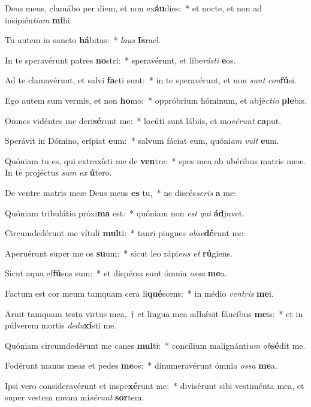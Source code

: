 \item Deus meus, clamábo per diem, et non ex\textbf{áu}dies:~* et nocte, et non ad insipién\textit{tiam} \textbf{mi}hi.
\item Tu autem in sancto \textbf{há}bitas:~* \textit{laus} \textbf{Is}rael.
\item In te speravérunt patres \textbf{no}stri:~* speravérunt, et libe\textit{rásti} \textbf{e}os.
\item Ad te clamavérunt, et salvi \textbf{fa}cti sunt:~* in te speravérunt, et non \textit{sunt} \textit{con}\textbf{fú}si.
\item Ego autem sum vermis, et non \textbf{ho}mo:~* oppróbrium hóminum, et abjé\tinyhspace\textit{ctio} \textbf{ple}bis.
\item Omnes vidéntes me deri\textbf{sé}runt me:~* locúti sunt lábiis, et mo\textit{vérunt} \textbf{ca}put.
\item Sperávit in Dómino, erípiat \textbf{e}um:~* salvum fáciat eum, quóni\tinyhspace\textit{am} \textit{vult} \textbf{e}um.
\item Quóniam tu es, qui extraxísti me de \textbf{ven}tre:~* spes mea ab ubéribus matris meæ. In te projéctus \textit{sum} \textit{ex} \textbf{ú}tero.
\item De ventre matris meæ Deus meus \textbf{es} tu,~* ne discés\spurhspace\textit{seris} \textbf{a} me:
\item Quóniam tribulátio próxi\textbf{ma} est:~* quóniam non \textit{est} \textit{qui} \textbf{ád}juvet.
\item Circumdedérunt me vítuli \textbf{mul}ti:~* tauri pingues \textit{obse}\textbf{dé}runt me.
\item Aperuérunt super me os \textbf{su}um:~* sicut leo rápi\tinyhspace\textit{ens} \textit{et} \textbf{rú}giens.
\item Sicut aqua ef\textbf{fú}sus sum:~* et dispérsa sunt ómnia \textit{ossa} \textbf{me}a.
\item Factum est cor meum tamquam cera li\textbf{qué}scens:~* in médio \textit{ventris} \textbf{me}i.
\item Aruit tamquam testa virtus mea,~† et lingua mea adhǽsit fáucibus \textbf{me}is:~* et in púlverem mortis \textit{dedu}\textbf{xí}sti me.
\item Quóniam circumdedérunt me canes \textbf{mul}ti:~* concílium malignánti\spurhspace\textit{um} \textit{ob}\textbf{sé}dit me.
\item Fodérunt manus meas et pedes \textbf{me}os:~* dinumeravérunt ómnia \textit{ossa} \textbf{me}a.
\item Ipsi vero consideravérunt et inspe\textbf{xé}runt me:~* divisérunt sibi vestiménta mea, et super vestem meam mi\spurhspace\textit{sérunt} \textbf{sor}tem.
